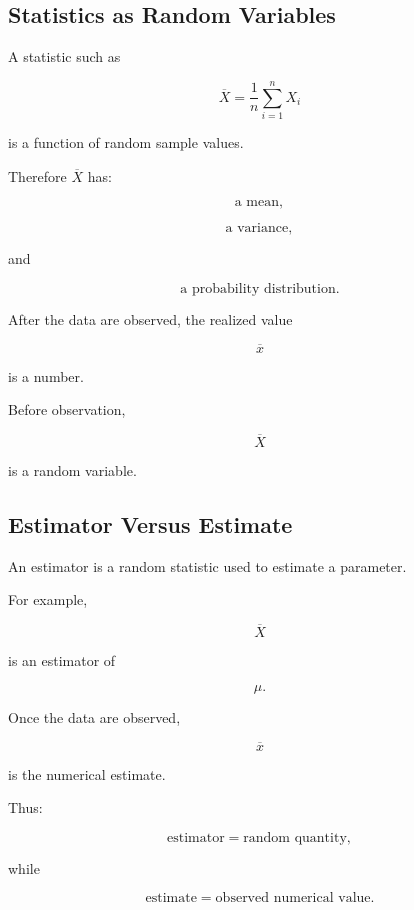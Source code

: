 \subsection{Statistics as Random Variables}
\label{subsec:statistics-random-variables}

A statistic such as

\[
\overline{X}
=
\frac1n
\sum_{i=1}^{n}X_i
\]

is a function of random sample values.

Therefore \(\overline{X}\) has:

\[
\boxed{
\text{a mean},
}
\]

\[
\boxed{
\text{a variance},
}
\]

and

\[
\boxed{
\text{a probability distribution}.
}
\]

After the data are observed, the realized value

\[
\overline{x}
\]

is a number.

Before observation,

\[
\overline{X}
\]

is a random variable.

\subsection{Estimator Versus Estimate}
\label{subsec:estimator-versus-estimate}

An estimator is a random statistic used to estimate a parameter.

For example,

\[
\boxed{
\overline{X}
}
\]

is an estimator of

\[
\mu.
\]

Once the data are observed,

\[
\boxed{
\overline{x}
}
\]

is the numerical estimate.

Thus:

\[
\boxed{
\text{estimator}
=
\text{random quantity},
}
\]

while

\[
\boxed{
\text{estimate}
=
\text{observed numerical value}.
}
\]

